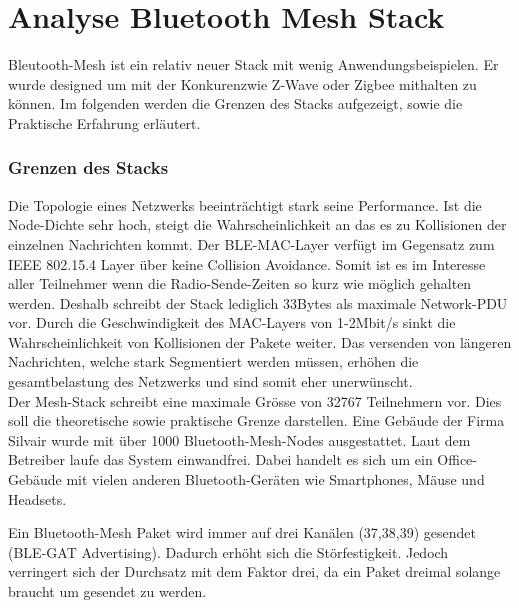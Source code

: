 \clearpage
\section{Analyse Bluetooth Mesh Stack}\label{sec:AnalyseBluetoothMeshStack}

Bleutooth-Mesh ist ein relativ neuer Stack mit wenig Anwendungsbeispielen. Er wurde designed um mit der Konkurenzwie Z-Wave oder Zigbee mithalten zu können. Im folgenden werden die Grenzen des Stacks aufgezeigt, sowie die Praktische Erfahrung erläutert.



\subsubsection{Grenzen des Stacks}\label{subsec:BLEMeshProtokollStack}

Die Topologie eines Netzwerks beeinträchtigt stark seine Performance. Ist die Node-Dichte sehr hoch, steigt die Wahrscheinlichkeit an das es zu Kollisionen der einzelnen Nachrichten kommt. Der BLE-MAC-Layer verfügt im Gegensatz zum IEEE 802.15.4 Layer über keine Collision Avoidance. Somit ist es im Interesse aller Teilnehmer wenn die Radio-Sende-Zeiten so kurz wie möglich gehalten werden. Deshalb schreibt der Stack lediglich 33Bytes als maximale Network-PDU vor. Durch die Geschwindigkeit des MAC-Layers von 1-2Mbit/s sinkt die Wahrscheinlichkeit von Kollisionen der Pakete weiter. Das versenden von längeren Nachrichten, welche stark Segmentiert werden müssen, erhöhen die gesamtbelastung des Netzwerks und sind somit eher unerwünscht. \cite{bluetooth_sig_mesh_netzwerk_spezifikationen_2020}\\

Der Mesh-Stack schreibt eine maximale Grösse von 32767 Teilnehmern vor. Dies soll die theoretische sowie praktische Grenze darstellen. Eine Gebäude der Firma Silvair wurde mit über 1000 Bluetooth-Mesh-Nodes ausgestattet. Laut dem Betreiber laufe das System einwandfrei. Dabei handelt es sich um ein Office-Gebäude mit vielen anderen Bluetooth-Geräten wie Smartphones, Mäuse und Headsets.  \cite{woolley_how_bluetooth_mesh_puts_the_large__2018}

Ein Bluetooth-Mesh Paket wird immer auf drei Kanälen (37,38,39) gesendet (BLE-GAT Advertising). Dadurch erhöht sich die Störfestigkeit. Jedoch verringert sich der Durchsatz mit dem Faktor drei, da ein Paket dreimal solange braucht um gesendet zu werden. 



